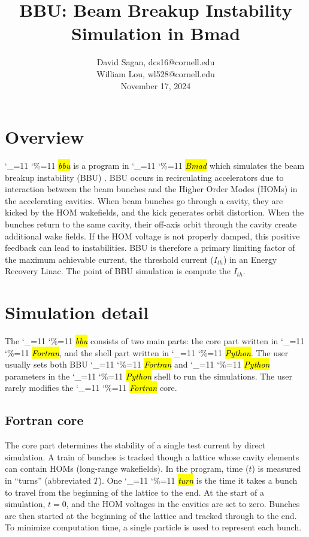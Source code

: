 \documentclass{hitec}
\title{BBU: Beam Breakup Instability Simulation in Bmad}
\author{}
\date{David Sagan, dcs16@cornell.edu \\
William Lou, wl528@cornell.edu \\
November 17, 2024}
\newcommand\dottcmd[1]{\hl{\em#1}\endgroup}
\newcommand{\vn}{\begingroup\catcode`\_=11 \catcode`\%=11 \dottcmd}
\newcommand{\bbu}{\vn{bbu}\xspace}
\begin{document}
\maketitle

\section{Overview}

\bbu is a program in \vn{Bmad} which simulates the beam breakup instability (BBU) \cite{Bmad}. BBU
occurs in recirculating accelerators due to interaction between the beam bunches and the Higher
Order Modes (HOMs) in the accelerating cavities. When beam bunches go through a cavity, they are
kicked by the HOM wakefields, and the kick generates orbit distortion. When the bunches return to
the same cavity, their off-axis orbit through the cavity create additional wake fields. If the HOM
voltage is not properly damped, this positive feedback can lead to instabilities. BBU is therefore a
primary limiting factor of the maximum achievable current, the threshold current ($I_{th}$) in an
Energy Recovery Linac. The point of BBU simulation is compute the $I_{th}$.

\section{Simulation detail}

The \bbu consists of two main parts: the core part written in \vn{Fortran}, and the shell part
written in \vn{Python}. The user usually sets both BBU \vn{Fortran} and \vn{Python} parameters in
the \vn{Python} shell to run the simulations. The user rarely modifies the \vn{Fortran} core.

\subsection{Fortran core} The core part determines the stability of a single test current by direct
simulation. A train of bunches is tracked though a lattice whose cavity elements can contain HOMs
(long-range wakefields). In the program, time ($t$) is measured in “turns” (abbreviated $T$). One
\vn{turn} is the time it takes a bunch to travel from the beginning of the lattice to the end. At
the start of a simulation, $t=0$, and the HOM voltages in the cavities are set to zero. Bunches are
then started at the beginning of the lattice and tracked through to the end. To minimize computation
time, a single particle is used to represent each bunch.
\end{document}

